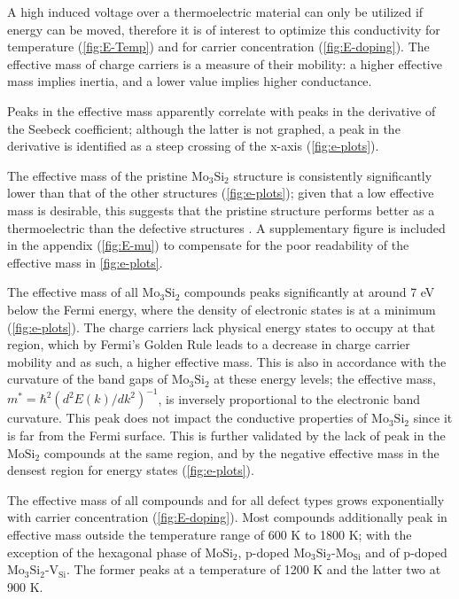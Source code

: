 \documentclass[7.5pt]{article}
\theoremstyle{plain}
\theoremstyle{definition}
\newcommand{\<}{\langle}
\renewcommand{\>}{\rangle}
\begin{document}
\begin{multicols}{2}

\noindent A high induced voltage over a thermoelectric material can only be utilized if energy can be moved, therefore it is of interest to optimize this conductivity for temperature (\autoref{fig:E-Temp}) and for carrier concentration (\autoref{fig:E-doping}).
The effective mass of charge carriers is a measure of their mobility: a higher effective mass implies inertia, and a lower value implies higher conductance. 

Peaks in the effective mass apparently correlate with peaks in the derivative of the Seebeck coefficient; although the latter is not graphed, a peak in the derivative is identified as a steep crossing of the x-axis (\autoref{fig:e-plots}).

The effective mass of the pristine $\text{Mo}_3\text{Si}_2$ structure is consistently significantly lower than that of the other structures (\autoref{fig:e-plots}); given that a low effective mass is desirable, this suggests that the pristine structure performs better as a thermoelectric than the defective structures \cite{alma9939162912205131}.
A supplementary figure is included in the appendix (\autoref{fig:E-mu}) to compensate for the poor readability of the effective mass in \autoref{fig:e-plots}.

The effective mass of all $\text{Mo}_3\text{Si}_2$ compounds peaks significantly at around 7 eV below the Fermi energy, where the density of electronic states is at a minimum (\autoref{fig:e-plots}). 
The charge carriers lack physical energy states to occupy at that region, which by Fermi's Golden Rule leads to a decrease in charge carrier mobility and as such, a higher effective mass. 
This is also in accordance with the curvature of the band gaps of $\text{Mo}_3\text{Si}_2$ at these energy levels; the effective mass, $m^*=\hbar^2\left(d^2 E(k) / d k^2\right)^{-1}$, is inversely proportional to the electronic band curvature.
This peak does not impact the conductive properties of $\text{Mo}_3\text{Si}_2$ since it is far from the Fermi surface.
This is further validated by the lack of peak in the $\text{MoSi}_2$ compounds at the same region, and by the negative effective mass in the densest region for energy states (\autoref{fig:e-plots}).

The effective mass of all compounds and for all defect types grows exponentially with carrier concentration (\autoref{fig:E-doping}).
Most compounds additionally peak in effective mass outside the temperature range of 600 K to 1800 K; with the exception of the hexagonal phase of $\text{MoSi}_2$, p-doped $\text{Mo}_3\text{Si}_2$-$\text{Mo}_{\text{Si}}$ and of p-doped $\text{Mo}_3\text{Si}_2$-$\text{V}_\text{Si}$.
The former peaks at a temperature of 1200 K and the latter two at 900 K.

\end{multicols}
\end{document}
